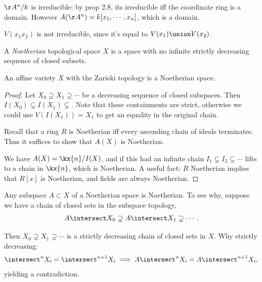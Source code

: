 \begin{example}

\(\AA^n/k\) is irreducible: by prop 2.8, its irreducible iff the
coordinate ring is a domain. However \(A(\AA^n) = k[x_1, \cdots, x_n]\),
which is a domain.

\end{example}

\begin{example}

\(V(x_1 x_2)\) is not irreducible, since it's equal to
\(V(x_1) \union V(x_2)\).

\end{example}

\begin{definition}

A \emph{Noetherian} topological space \(X\) is a space with no infinite
strictly decreasing sequence of closed subsets.

\end{definition}

\begin{proposition}[?]

An affine variety \(X\) with the Zariski topology is a Noetherian space.

\end{proposition}

\begin{proof}

Let \(X_0 \supsetneq X_1 \supsetneq \cdots\) be a decreasing sequence of
closed subspaces. Then \(I(X_0) \subsetneq I(X_1) \subsetneq\). Note
that these containments are strict, otherwise we could use
\(V(I(X_1)) = X_1\) to get an equality in the original chain.

Recall that a ring \(R\) is Noetherian iff every ascending chain of
ideals terminates. Thus it suffices to show that \(A(X)\) is Noetherian.

We have \(A(X) = \kx{n} / I(X)\), and if this had an infinite chain
\(I_1 \subsetneq I_2 \subsetneq \cdots\) lifts to a chain in \(\kx{n}\),
which is Noetherian. A useful fact: \(R\) Noetherian implies that
\(R[x]\) is Noetherian, and fields are always Noetherian.

\end{proof}

\begin{remark}

Any subspace \(A\subset X\) of a Noetherian space is Noetherian. To see
why, suppose we have a chain of closed sets in the subspace topology,
\begin{align*}  
A\intersect X_0 \supsetneq A\intersect X_1 \supsetneq \cdots
.\end{align*}

Then \(X_0 \supsetneq X_1 \supsetneq \cdots\) is a strictly decreasing
chain of closed sets in \(X\). Why strictly decreasing:
\begin{align*}
\intersect^n X_i = \intersect^{n+1} X_i \implies A\intersect^n X_i = A\intersect^{n+1} X_i
,\end{align*} yielding a contradiction.

\end{remark}

